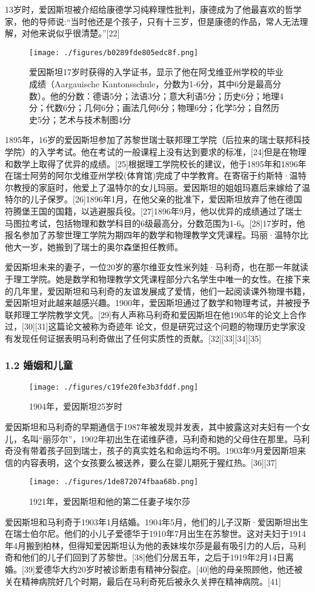 13岁时，爱因斯坦被介绍给康德学习纯粹理性批判，康德成为了他最喜欢的哲学家，他的导师说:“当时他还是个孩子，只有十三岁，但是康德的作品，常人无法理解，对他来说似乎很清楚。”[22]
\begin{figure}[ht]
\centering
\texttt{[image: ./figures/b0289fde805edc8f.png]}
\caption{爱因斯坦17岁时获得的入学证书，显示了他在阿戈维亚州学校的毕业成绩（Aargauische Kantonsschule，分数为1-6分，其中6分是最高分数）。他的分数：德语5分；法语3分；意大利语5分；历史6分；地理4分；代数6分；几何6分；画法几何6分；物理6分；化学5分；自然历史5分；艺术与技术制图4分} \label{fig_AYST_3}
\end{figure}
1895年，16岁的爱因斯坦参加了苏黎世瑞士联邦理工学院（后拉来的瑞士联邦科技学院）的入学考试。他在考试的一般课程上没有达到要求的标准，[24]但是在物理和数学上取得了优异的成绩。[25]根据理工学院校长的建议，他于1895年和1896年在瑞士阿劳的阿尔戈维亚州学校(体育馆)完成了中学教育。在寄宿于约斯特·温特尔教授的家庭时，他爱上了温特尔的女儿玛丽。爱因斯坦的姐姐玛嘉后来嫁给了温特尔的儿子保罗。[26]1896年1月，在他父亲的批准下，爱因斯坦放弃了他在德国符腾堡王国的国籍，以逃避服兵役。[27]1896年9月，他以优异的成绩通过了瑞士马图拉考试，包括物理和数学科目的6级最高分，分数范围为1-6。[28]17岁时，他报名参加了苏黎世理工学院为期四年的数学和物理教学文凭课程。玛丽·温特尔比他大一岁，她搬到了瑞士的奥尔森堡担任教师。

爱因斯坦未来的妻子，一位20岁的塞尔维亚女性米列娃·马利奇，也在那一年就读于理工学院。她是数学和物理教学文凭课程部分六名学生中唯一的女性。在接下来的几年里，爱因斯坦和马利奇的友谊发展成了爱情，他们一起阅读课外物理书籍，爱因斯坦对此越来越感兴趣。1900年，爱因斯坦通过了数学和物理考试，并被授予联邦理工学院教学文凭。[29]有人声称马利奇和爱因斯坦在他1905年的论文上合作过，[30][31]这篇论文被称为奇迹年 论文，但是研究过这个问题的物理历史学家没有发现任何证据表明马利奇做出了任何实质性的贡献。[32][33][34][35]

\subsubsection{1.2 婚姻和儿童}
\begin{figure}[ht]
\centering
\texttt{[image: ./figures/c19fe20fe3b3fddf.png]}
\caption{1904年，爱因斯坦25岁时} \label{fig_AYST_4}
\end{figure}
爱因斯坦和马利奇的早期通信于1987年被发现并发表，其中披露这对夫妇有一个女儿，名叫“丽莎尔”，1902年初出生在诺维萨德，马利奇和她的父母住在那里。马利奇没有带着孩子回到瑞士，孩子的真实姓名和命运均不明。1903年9月爱因斯坦来信的内容表明，这个女孩要么被送养，要么在婴儿期死于猩红热。[36][37]
\begin{figure}[ht]
\centering
\texttt{[image: ./figures/1de872074fbaa68b.png]}
\caption{1921年，爱因斯坦和他的第二任妻子埃尔莎} \label{fig_AYST_5}
\end{figure}
爱因斯坦和马利奇于1903年1月结婚。1904年5月，他们的儿子汉斯·爱因斯坦出生在瑞士伯尔尼。他们的小儿子爱德华于1910年7月出生在苏黎世。这对夫妇于1914年4月搬到柏林，但得知爱因斯坦认为他的表妹埃尔莎是最有吸引力的人后，马利奇和他们的儿子们回到了苏黎世。[38]他们分居五年，之后于1919年2月14日离婚。[39]爱德华大约20岁时被诊断患有精神分裂症。[40]他的母亲照顾他，他还被关在精神病院好几个时期，最后在马利奇死后被永久关押在精神病院。[41]

